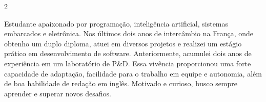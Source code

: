 \documentclass[10pt,a4paper,ragged2e,withhyper]{altacv}
\begin{document}
\begin{paracol}{2}





Estudante apaixonado por programação, inteligência artificial, sistemas embarcados e eletrônica. 
Nos últimos dois anos de intercâmbio na França, onde obtenho um duplo diploma, atuei em 
diversos projetos e realizei um estágio prático em desenvolvimento de software. Anteriormente, 
acumulei dois anos de experiência em um laboratório de P\&D. Essa vivência proporcionou uma 
forte capacidade de adaptação, facilidade para o trabalho em equipe e autonomia, além de 
boa habilidade de redação em inglês. Motivado e curioso, busco sempre aprender e superar novos desafios.










\end{paracol}
\end{document}
